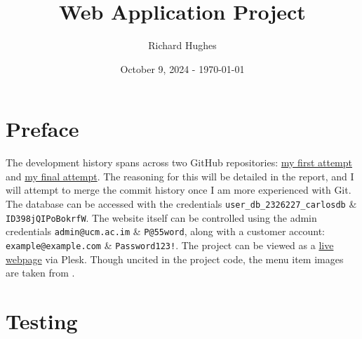 \documentclass{article}
\title{Web Application Project}
\author{Richard Hughes}
\date{October 9, 2024 - \today}
\begin{document}
\maketitle
\newpage

\section*{Preface}
  The development history spans across two GitHub repositories: 
  \href{https://github.com/richardh05/Web-Application-Development-J110823}{my first attempt} and 
  \href{https://github.com/richardh05/Carlos-Pizza}{my final attempt}.
  The reasoning for this will be detailed in the report, and I will attempt to merge the commit history once I am more experienced with Git. The database can be accessed with the credentials 
  \verb|user_db_2326227_carlosdb| \& \verb|ID398jQIPoBokrfW|. The website itself can be controlled using the admin credentials
  \verb|admin@ucm.ac.im| \& \verb|P@55word|, along with a customer account:
  \verb|example@example.com| \& \verb|Password123!|. 
  The project can be viewed as a \href{https://2326227.win.studentwebserver.co.uk/CO5227}{live webpage} via Plesk. Though uncited in the project code, the menu item images are taken from  \textcite{DominosMenu}.

\tableofcontents
\newpage


\section{Testing}
\end{document}
